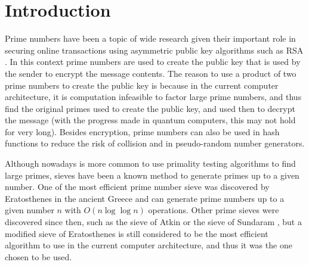 \documentclass[runningheads,a4paper]{llncs}
\begin{document}
\section{Introduction}
\label{Introduction}

Prime numbers have been a topic of wide research given their important role in securing online transactions using asymmetric public key algorithms such as RSA \cite{standard2012rsa}. In this context prime numbers are used to create the public key that is used by the sender to encrypt the message contents. The reason to use a product of two prime numbers to create the public key is because in the current computer architecture, it is computation infeasible to factor large prime numbers, and thus find the original primes used to create the public key, and used then to decrypt the message (with the progress made in quantum computers, this may not hold for very long). Besides encryption, prime numbers can also be used in hash functions to reduce the risk of collision and in pseudo-random number generators.

Although nowadays is more common to use primality testing algorithms \cite{primality1981lenstra} to find large primes, sieves have been a known method to generate primes up to a given number. One of the most efficient prime number sieve was discovered by Eratosthenes \cite{eratosthenes2009neill} in the ancient Greece and can generate prime numbers up to a given number $n$ with $O(n\log{\log{n}})$ operations. Other prime sieves were discovered since then, such as the sieve of Atkin \cite{atkin2004prime} or the sieve of Sundaram \cite{aiyar1934sundaram}, but a modified sieve of Eratosthenes is still considered to be the most efficient algorithm to use in the current computer architecture, and thus it was the one chosen to be used. 
\end{document}
